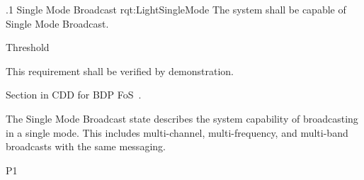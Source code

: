 
\ONERQMTVKSA
{\RqtNumberBase.1}
{Single Mode Broadcast}
{rqt:LightSingleMode}
{The system shall be capable of Single Mode Broadcast.}
{
	\item [Phase 1] Threshold
}
{This requirement shall be verified by demonstration.}
{
\item [5.5.3] Section in CDD for BDP FoS~\cite{ref__BDP_FOS_CDD}.
}
{
	\item The Single Mode Broadcast state describes the system capability of broadcasting in a single mode. This includes multi-channel, multi-frequency, and multi-band broadcasts with the same messaging.
}
{P1}



